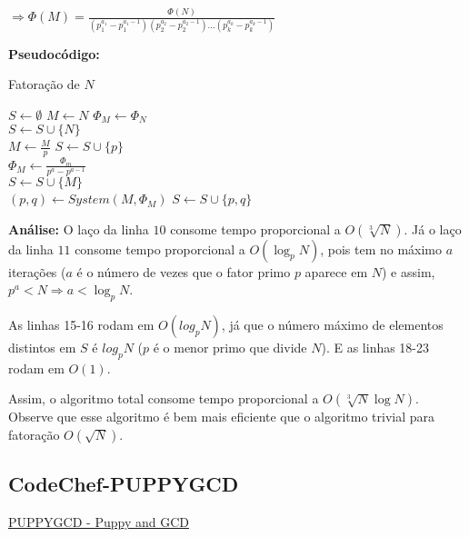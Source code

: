 $\Rightarrow \Phi(M) = \frac{\Phi(N)}{(p_1^{a_1}-p_1^{a_1-1})(p_2^{a_2} - p_2^{a_2-1})...(p_k^{a_k}-p_k^{a_k-1})}$
\clearpage

\textbf{Pseudocódigo:}
\begin{algorithm}
\caption{Fatoração de $N$}
\begin{algorithmic}[1]
\State $S \gets \emptyset$ 
\State $M \gets N$
\State $\Phi_M \gets \Phi_N$
\\
 
\State $S \gets S \cup \{N\}$
\State {}
\EndIf
\\
\State $M \gets \frac{M}{p}$
\State $S \gets S \cup \{p\}$
\EndWhile
\EndFor
\\
\State $\Phi_M \gets \frac{\Phi_m}{p^a - p^{a-1}}$ 
\EndFor
\\
 
\State $S \gets S \cup \{M\}$
\State {}
\EndIf
\\
\State $(p, q) \gets System(M, \Phi_M)$ 
\State $S \gets S \cup \{p, q\}$
\State {}

\EndProcedure
\end{algorithmic}
\end{algorithm}


\textbf{Análise:}
O laço da linha $10$ consome tempo proporcional a $O(\sqrt[3]N)$. Já o laço da linha $11$ consome tempo proporcional a $O(\log_pN)$, pois tem no máximo $a$ iterações ($a$ é o número de vezes que o fator primo $p$ aparece em $N$) e assim, $p^a < N \Rightarrow a < \log_p{N}$. 

As linhas 15-16 rodam em $O(log_pN)$, já que o número máximo de elementos distintos em $S$ é $log_pN$ ($p$ é o menor primo que divide $N$).
E as linhas 18-23 rodam em $O(1)$.

Assim, o algoritmo total consome tempo proporcional a $O(\sqrt[3]N \log N)$. 
Observe que esse algoritmo é bem mais eficiente que o algoritmo trivial para fatoração $O(\sqrt N)$.


\subsection{CodeChef-PUPPYGCD}
\href{https://www.codechef.com/problems/PUPPYGCD}{PUPPYGCD - Puppy and GCD}\\


